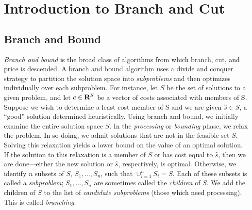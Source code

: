 
\section{Introduction to Branch and Cut}
\label{B&C-intro}

\subsection{Branch and Bound}

{\em Branch and bound} is the broad class of algorithms from which
branch, cut, and price is descended. A branch and bound algorithm uses
a divide and conquer strategy to partition the solution space into
{\em subproblems} and then optimizes individually over each
subproblem. For instance, let $S$ be the set of solutions to a given
problem, and let $c \in {\bf R}^S$ be a vector of costs associated
with members of S. Suppose we wish to determine a least cost member of
S and we are given $\hat{s} \in S$, a ``good'' solution determined
heuristically. Using branch and bound, we initially examine the entire
solution space $S$. In the {\em processing} or {\em bounding} phase,
we relax the problem. In so doing, we admit solutions that are not in
the feasible set $S$. Solving this relaxation yields a lower bound on
the value of an optimal solution. If the solution to this relaxation
is a member of $S$ or has cost equal to $\hat{s}$, then we are
done---either the new solution or $\hat{s}$, respectively, is optimal.
Otherwise, we identify $n$ subsets of $S$, $S_1, \ldots, S_n$, such
that $\cup_{i = 1}^n S_i = S$. Each of these subsets is called a {\em
subproblem}; $S_1, \ldots, S_n$ are sometimes called the {\em
children} of $S$. We add the children of $S$ to the list of {\em
candidate subproblems} (those which need processing). This is called
{\em branching}.

